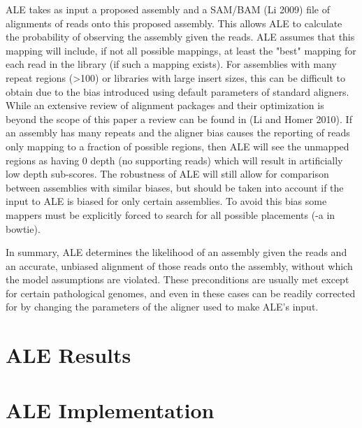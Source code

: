 \documentclass[phd,tocprelim]{cornell}
\begin{document}
ALE takes as input a proposed assembly and a SAM/BAM (Li 2009) file of alignments of reads onto this proposed assembly. This allows ALE to calculate the probability of observing the assembly given the reads. ALE assumes that this mapping will include, if not all possible mappings, at least the "best" mapping for each read in the library (if such a mapping exists). For assemblies with many repeat regions (>100) or libraries with large insert sizes, this can be difficult to obtain due to the bias introduced using default parameters of standard aligners. While an extensive review of alignment packages and their optimization is beyond the scope of this paper a review can be found in (Li and Homer 2010). If an assembly has many repeats and the aligner bias causes the reporting of reads only mapping to a fraction of possible regions, then ALE will see the unmapped regions as having 0 depth (no supporting reads) which will result in artificially low depth sub-scores. The robustness of ALE will still allow for comparison between assemblies with similar biases, but should be taken into account if the input to ALE is biased for only certain assemblies. To avoid this bias some mappers must be explicitly forced to search for all possible placements (-a in bowtie).

In summary, ALE determines the likelihood of an assembly given the reads and an accurate, unbiased alignment of those reads onto the assembly, without which the model assumptions are violated. These preconditions are usually met except for certain pathological genomes, and even in these cases can be readily corrected for by changing the parameters of the aligner used to make ALE’s input.



\chapter{ALE Results} %
\label{cha:ALE Results}


\chapter{ALE Implementation} %
\label{cha:ALE Implementation}


\end{document}

